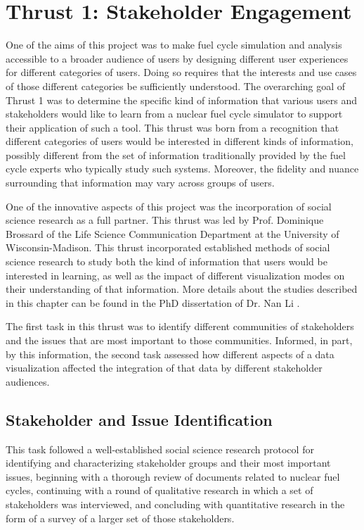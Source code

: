 \chapter{Thrust 1: Stakeholder Engagement}\label{chap:thrust1}

One of the aims of this project was to make fuel cycle simulation and analysis
accessible to a broader audience of users by designing different user
experiences for different categories of users.  Doing so requires that the
interests and use cases of those different categories be sufficiently
understood.  The overarching goal of Thrust 1 was to determine the
specific kind of information that various users and stakeholders would like to
learn from a nuclear fuel cycle simulator to support their application of such
a tool.  This thrust was born from a recognition that different categories of
users would be interested in different kinds of information, possibly
different from the set of information traditionally provided by the fuel cycle
experts who typically study such systems.  Moreover, the fidelity and nuance
surrounding that information may vary across groups of users.

One of the innovative aspects of this project was the incorporation of social
science research as a full partner.  This thrust was led by Prof. Dominique
Brossard of the Life Science Communication Department at the University of
Wisconsin-Madison.  This thrust incorporated established methods of social
science research to study both the kind of information that users would be
interested in learning, as well as the impact of different visualization modes
on their understanding of that information.  More details about the studies
described in this chapter can be found in the PhD dissertation of Dr. Nan Li
.

The first task in this thrust was to identify different communities of
stakeholders and the issues that are most important to those communities.
Informed, in part, by this information, the second task assessed how different
aspects of a data visualization affected the integration of that data by
different stakeholder audiences.

\section{Stakeholder and Issue Identification}

This task followed a well-established social science research protocol for
identifying and characterizing stakeholder groups and their most important
issues, beginning with a thorough review of documents related to nuclear fuel
cycles, continuing with a round of qualitative research in which a set of
stakeholders was interviewed, and concluding with quantitative research in the
form of a survey of a larger set of those stakeholders.

